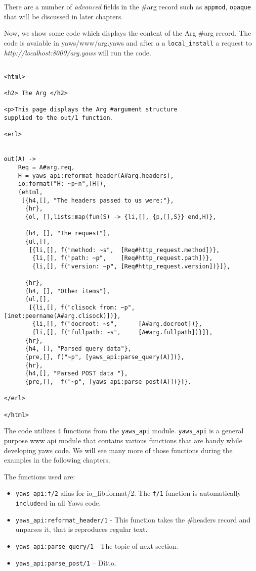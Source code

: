\documentclass[11pt,oneside,english]{book}
\begin{document}
There are a number of \textit{advanced} fields in the \#arg record
such as \verb+appmod+, \verb+opaque+ that will be discussed in later chapters.

Now, we show some code which displays the content of the Arg \#arg record.
The code is avaiable in yaws/www/arg.yaws and after a a \verb+local_install+
a request to \textit{http://localhost:8000/arg.yaws} will run the code.

\begin{verbatim}

<html>

<h2> The Arg </h2>

<p>This page displays the Arg #argument structure
supplied to the out/1 function.

<erl>


out(A) ->
    Req = A#arg.req,
    H = yaws_api:reformat_header(A#arg.headers),
    io:format("H: ~p~n",[H]),
    {ehtml,
     [{h4,[], "The headers passed to us were:"},
      {hr},
      {ol, [],lists:map(fun(S) -> {li,[], {p,[],S}} end,H)},

      {h4, [], "The request"},
      {ul,[],
       [{li,[], f("method: ~s",  [Req#http_request.method])},
        {li,[], f("path: ~p",    [Req#http_request.path])},
        {li,[], f("version: ~p", [Req#http_request.version])}]},

      {hr},
      {h4, [], "Other items"},
      {ul,[],
       [{li,[], f("clisock from: ~p", [inet:peername(A#arg.clisock)])},
        {li,[], f("docroot: ~s",      [A#arg.docroot])},
        {li,[], f("fullpath: ~s",     [A#arg.fullpath])}]},
      {hr},
      {h4, [], "Parsed query data"},
      {pre,[], f("~p", [yaws_api:parse_query(A)])},
      {hr},
      {h4,[], "Parsed POST data "},
      {pre,[],  f("~p", [yaws_api:parse_post(A)])}]}.

</erl>

</html>

\end{verbatim}


The code utilizes 4 functions from the \verb+yaws_api+ module.
\verb+yaws_api+ is a general purpose www api module that contains various
functions that are handy while developing yaws code. We will see many 
more of those functions during the examples in the following chapters.

The functions used are:
\begin{itemize}
\item \verb+yaws_api:f/2+ alias for io\_lib:format/2. The \verb+f/1+ function
is automatically \verb+-include+ed in all Yaws code.
\item \verb+yaws_api:reformat_header/1+ - This function takes the \#headers record
and unparses it, that is reproduces regular text.
\item \verb+yaws_api:parse_query/1+ - The topic of next section.
\item \verb+yaws_api:parse_post/1+ -- Ditto.
\end{itemize}
\end{document}
